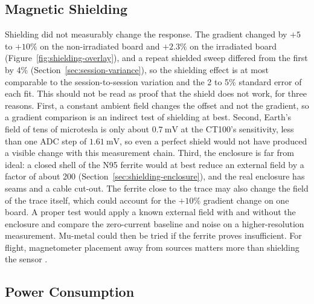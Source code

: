 \documentclass[12pt,a4paper]{article}
\begin{document}
\subsection{Magnetic Shielding}
\label{sec:disc-shielding}

Shielding did not measurably change the response. The gradient changed by $+5$ to $+10\%$ on the non-irradiated board and $+2.3\%$ on the irradiated board (Figure~\ref{fig:shielding-overlay}), and a repeat shielded sweep differed from the first by 4\% (Section~\ref{sec:session-variance}), so the shielding effect is at most comparable to the session-to-session variation and the 2 to 5\% standard error of each fit. This should not be read as proof that the shield does not work, for three reasons. First, a constant ambient field changes the offset and not the gradient, so a gradient comparison is an indirect test of shielding at best. Second, Earth's field of tens of microtesla is only about $\SI{0.7}{\milli\volt}$ at the CT100's sensitivity, less than one ADC step of $\SI{1.61}{\milli\volt}$, so even a perfect shield would not have produced a visible change with this measurement chain. Third, the enclosure is far from ideal: a closed shell of the N95 ferrite would at best reduce an external field by a factor of about 200 (Section~\ref{sec:shielding-enclosure}), and the real enclosure has seams and a cable cut-out. The ferrite close to the trace may also change the field of the trace itself, which could account for the $+10\%$ gradient change on one board. A proper test would apply a known external field with and without the enclosure and compare the zero-current baseline and noise on a higher-resolution measurement. Mu-metal could then be tried if the ferrite proves insufficient. For flight, magnetometer placement away from sources matters more than shielding the sensor \cite{nss_magnetometer}.

\subsection{Power Consumption}
\label{sec:disc-power}
\end{document}
